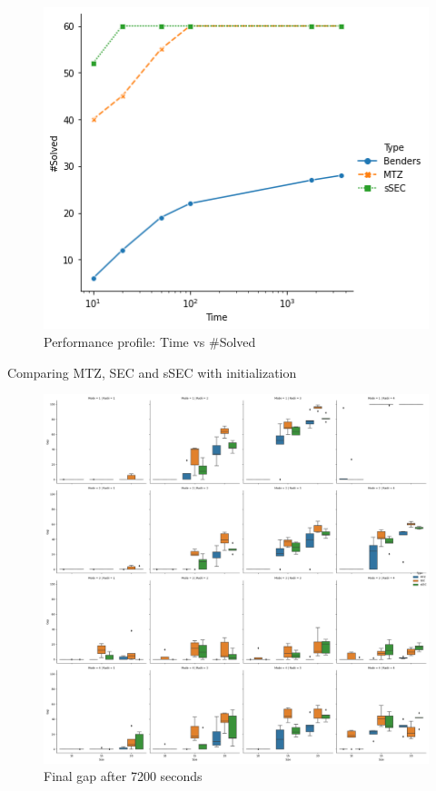 \documentclass[slidestop,usepdftitle=false,10pt]{beamer}
\begin{document}
	\begin{frame}
	    \begin{figure}[h!]
         \centering
         \includegraphics[width=0.6\linewidth]{instances_solved_benders.png}
         \caption{Performance profile: Time vs \#Solved }
         \label{fig:instances_solved_benders}
        \end{figure}
    \end{frame}
    
    \begin{frame}{Comparing MTZ, SEC and sSEC with initialization}
         \begin{figure}[h!]
          \centering
          \includegraphics[width=0.7\linewidth]{final_gap.png}
          \caption{Final gap after 7200 seconds}
          \label{fig:final_gap2}
         \end{figure}
    \end{frame}
    
\end{document}
